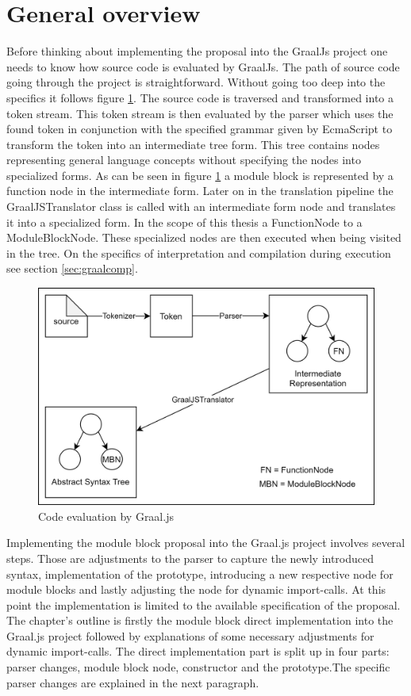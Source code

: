\section{General overview}
Before thinking about implementing the proposal into the GraalJs project one needs to know how source code is evaluated by GraalJs. The path of source code going through the project is straightforward. Without going too deep into the specifics it follows figure \ref{fig:mainImpl}. The source code is traversed and transformed into a token stream. This token stream is then evaluated by the parser which uses the found token in conjunction with the specified grammar given by EcmaScript \cite{ecma} to transform the token into an intermediate tree form. This tree contains nodes representing general language concepts without specifying the nodes into specialized forms. As can be seen in figure \ref{fig:mainImpl} a module block is represented by a function node in the intermediate form. Later on in the translation pipeline the GraalJSTranslator class is called with an intermediate form node and translates it into a specialized form. In the scope of this thesis a FunctionNode to a ModuleBlockNode. These specialized nodes are then executed when being visited in the tree. On the specifics of interpretation and compilation during execution see section \ref{sec:graalcomp}. 

\begin{figure}[h!]
    \includegraphics[scale=0.165]{figures/implMain.png}
    \caption{Code evaluation by Graal.js}
    \label{fig:mainImpl}
\end{figure}

Implementing the module block proposal into the Graal.js project involves several steps. Those are adjustments to the parser to capture the newly introduced syntax, implementation of the prototype, introducing a new respective node for module blocks and lastly adjusting the node for dynamic import-calls. At this point the implementation is limited to the available specification of the proposal. The chapter's outline is firstly the module block direct implementation into the Graal.js project followed by explanations of some necessary adjustments for dynamic import-calls. The direct implementation part is split up in four parts: parser changes, module block node, constructor and the prototype.The specific parser changes are explained in the next paragraph.

